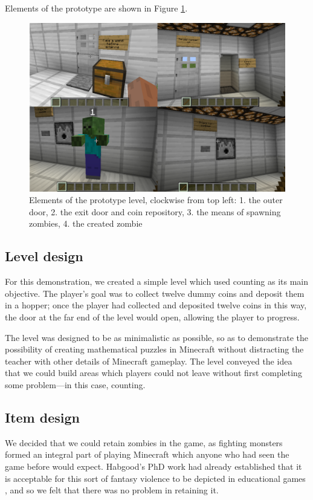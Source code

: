 Elements of the prototype are shown in Figure \ref{fig:prototype}.

\begin{figure}
\caption{Elements of the prototype level, clockwise from top left:
            1. the outer door, 2. the exit door and coin repository,
            3. the means of spawning zombies, 4. the created zombie}
\label{fig:prototype}
\includegraphics[width=13.5cm]{prototype-ssot-composite}
\end{figure}

\subsection{Level design}
For this demonstration, we created a simple level which used counting
as its main objective. The player's goal was to collect twelve
dummy coins and deposit them in a hopper; once the player had collected
and deposited twelve coins in this way, the door at the far end of the level
would open, allowing the player to progress.

The level was designed to be as minimalistic as possible, so as to 
demonstrate the possibility of creating mathematical puzzles in Minecraft
without distracting the teacher with other details of Minecraft gameplay.
The level conveyed the idea that we could build areas which players could not 
leave without first completing some problem---in this case, counting.

\subsection{Item design}
We decided that we could retain zombies in the game, as fighting monsters
formed an integral part of playing Minecraft which anyone who had seen the
game before would expect. Habgood's PhD work had already established that
it is acceptable for this sort of fantasy violence to be depicted in
educational games \cite{habgood07}, and so we felt that there was no
problem in retaining it.

